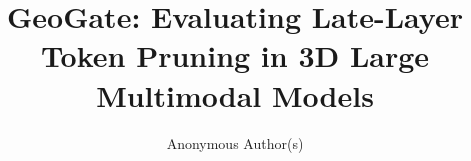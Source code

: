 \documentclass[10pt,twocolumn,letterpaper]{article}
\title{GeoGate: Evaluating Late-Layer Token Pruning in 3D Large Multimodal Models}
\author{Anonymous Author(s)}
\begin{document}

{
    \small
    
    
}
\end{document}

